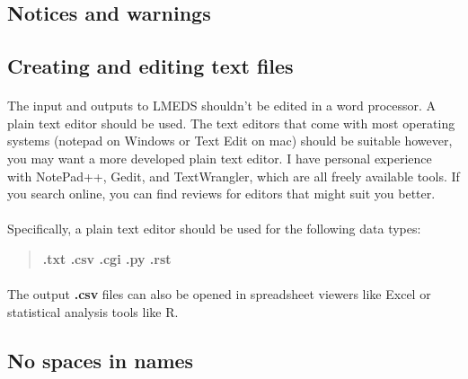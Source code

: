 
\begin{tcolorbox}[breakable,colback=white,colframe=red,width=\dimexpr\textwidth+12mm\relax,enlarge left by=-6mm]

\section{Notices and warnings}

\subsection{Creating and editing text files}

\paragraph{}

The input and outputs to LMEDS shouldn't be edited in a word processor.  A plain text editor should be used.  The text editors that come with most operating systems (notepad on Windows or Text Edit on mac) should be suitable however, you may want a more developed plain text editor.  I have personal experience with NotePad++, Gedit, and TextWrangler, which are all freely available tools.  If you search online, you can find reviews for editors that might suit you better.

\paragraph{}

Specifically, a plain text editor should be used for the following data types:

\begin{quote}
\textbf{.txt .csv .cgi .py .rst}
\end{quote}

\paragraph{}

The output \textbf{.csv} files can also be opened in spreadsheet viewers like Excel or statistical analysis tools like R.

\subsection{No spaces in names}


\end{tcolorbox}
